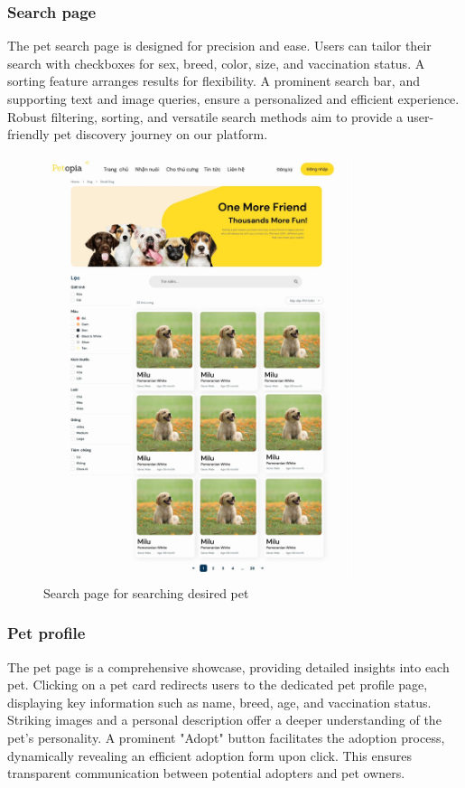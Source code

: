 \subsubsection{Search page}

The pet search page is designed for precision and ease. Users can tailor their search with checkboxes for sex, breed, color, size, and vaccination status. A sorting feature arranges results for flexibility. A prominent search bar, and supporting text and image queries, ensure a personalized and efficient experience. Robust filtering, sorting, and versatile search methods aim to provide a user-friendly pet discovery journey on our platform.

\begin{figure}[H]
    \centering
    \includegraphics[width=0.8\textwidth]{Figures/search_ui.jpg}
    \caption{Search page for searching desired pet}
\end{figure}


\subsubsection{Pet profile}

The pet page is a comprehensive showcase, providing detailed insights into each pet. Clicking on a pet card redirects users to the dedicated pet profile page, displaying key information such as name, breed, age, and vaccination status. Striking images and a personal description offer a deeper understanding of the pet's personality. A prominent "Adopt" button facilitates the adoption process, dynamically revealing an efficient adoption form upon click. This ensures transparent communication between potential adopters and pet owners.

